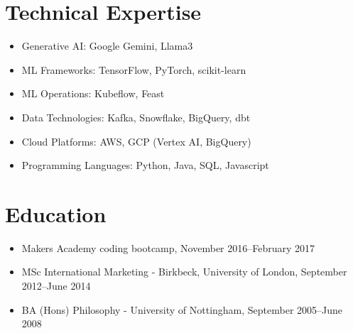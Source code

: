 \documentclass[a4paper]{scrartcl}
\begin{document}
\section*{Technical Expertise}
\begin{itemize}
	\item Generative AI: Google Gemini, Llama3
	\item ML Frameworks: TensorFlow, PyTorch, scikit-learn
	\item ML Operations: Kubeflow, Feast
	\item Data Technologies: Kafka, Snowflake, BigQuery, dbt
	\item Cloud Platforms: AWS, GCP (Vertex AI, BigQuery)
	\item Programming Languages: Python, Java, SQL, Javascript
\end{itemize}

\section*{Education}
\begin{itemize}
	\item Makers Academy coding bootcamp, November 2016--February 2017
	\item MSc International Marketing - Birkbeck, University of London, September 2012--June 2014
	\item BA (Hons) Philosophy - University of Nottingham, September 2005--June 2008
\end{itemize}
\end{document}
